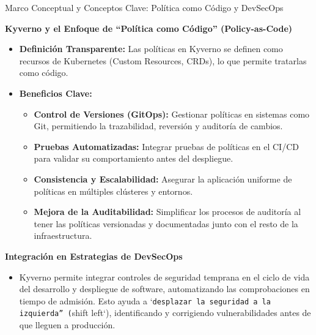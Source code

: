 \documentclass[aspectratio=169]{beamer}
\begin{document}
\begin{frame}{Marco Conceptual y Conceptos Clave: Política como Código y DevSecOps}


\textbf{Kyverno y el Enfoque de ``Política como Código'' (Policy-as-Code)}
\begin{itemize}
  \item \textbf{Definición Transparente:} Las políticas en Kyverno se definen como recursos de Kubernetes (Custom Resources, CRDs), lo que permite tratarlas como código.
  \item \textbf{Beneficios Clave:}
  \begin{itemize}
    \item \textbf{Control de Versiones (GitOps):} Gestionar políticas en sistemas como Git, permitiendo la trazabilidad, reversión y auditoría de cambios.
    \item \textbf{Pruebas Automatizadas:} Integrar pruebas de políticas en el CI/CD para validar su comportamiento antes del despliegue.
    \item \textbf{Consistencia y Escalabilidad:} Asegurar la aplicación uniforme de políticas en múltiples clústeres y entornos.
    \item \textbf{Mejora de la Auditabilidad:} Simplificar los procesos de auditoría al tener las políticas versionadas y documentadas junto con el resto de la infraestructura.
  \end{itemize}
\end{itemize}
\textbf{Integración en Estrategias de DevSecOps}
\begin{itemize}
  \item Kyverno permite integrar controles de seguridad temprana en el ciclo de vida del desarrollo y despliegue de software, automatizando las comprobaciones en tiempo de admisión. Esto ayuda a `\texttt{desplazar la seguridad a la izquierda'' (}shift left`), identificando y corrigiendo vulnerabilidades antes de que lleguen a producción.
\end{itemize}
\end{frame}
\end{document}
